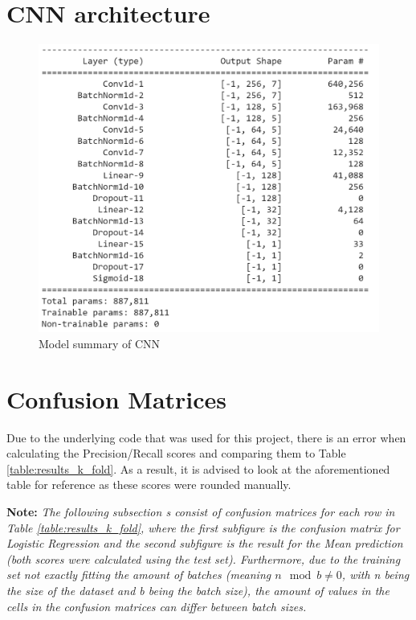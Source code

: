 \documentclass[sigconf]{acmart-txmm}
\begin{document}
\section{CNN architecture}
\label{appendix:a}

\begin{figure}[H]
  \centering
  \includegraphics[width=1\linewidth]{report/img/network_summary.png}
  \caption{Model summary of CNN}
  \label{fig:cnn_model_summary}
\end{figure}

\section{Confusion Matrices}
\label{appendix:b}
Due to the underlying code that was used for this project, there is an error when calculating the Precision/Recall scores and comparing them to Table \ref{table:results_k_fold}. As a result, it is advised to look at the aforementioned table for reference as these scores were rounded manually.

\textbf{Note: }\textit{The following subsection s consist of confusion matrices for each row in Table \ref{table:results_k_fold}, where the first subfigure is the confusion matrix for Logistic Regression and the second subfigure is the result for the Mean prediction (both scores were calculated using the test set). Furthermore, due to the training set not exactly fitting the amount of batches (meaning $n \mod b \neq 0$, with n being the size of the dataset and b being the batch size), the amount of values in the cells in the confusion matrices can differ between batch sizes.
}
\end{document}
